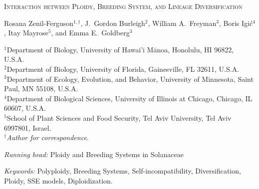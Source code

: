 \documentclass[11pt]{article}
\begin{document}


%
\begin{center}
    \textsc{Interaction between Ploidy, Breeding System, and Lineage Diversification}

\vfill

\noindent 
Rosana Zenil-Ferguson$^{1,\dagger}$,
%
J.~Gordon Burleigh$^{2}$,
%
William A.~Freyman$^{3}$,
%
Boris Igi\'c$^{4}$,
%
Itay Mayrose$^{5}$,
%
and Emma E.~Goldberg$^{3}$
%
\end{center}
%
\noindent$^{1}$Department of Biology, University of Hawai'i M\={a}noa, Honolulu, HI 96822, U.S.A.\\
%
\noindent$^{2}$Department of Biology, University of Florida, Gainesville, FL 32611, U.S.A.\\
%
\noindent$^{3}$Department of Ecology, Evolution, and Behavior, University of Minnesota, Saint Paul, MN 55108, U.S.A.\\
%
\noindent$^{4}$Department of Biological Sciences, University of Illinois at Chicago, Chicago, IL 60607, U.S.A. \\
%
\noindent$^{5}$School of Plant Sciences and Food Security, Tel Aviv University, Tel Aviv 6997801, Israel.\\
%
\noindent$^\dagger$\textit{Author for correspondence}.\\

\vfill

\noindent\textit{Running head:} 
Ploidy and Breeding Systems in Solanaceae

\noindent \textit{Keywords:} 
Polyploidy,
Breeding Systems,
Self-incompatibility,
Diversification, 
Ploidy,
SSE models,
Diploidization.

\vfill

\linenumbers


\clearpage



\clearpage




\end{document}
